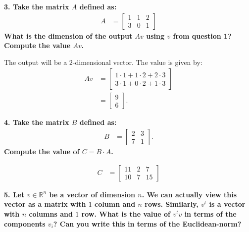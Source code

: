 \documentclass[12pt,hidelinks]{article}
\numberwithin{equation}{section}
\begin{document}
\vspace*{12pt}

\textbf{3. Take the matrix $A$ defined as:}
\begin{align}
A &= \begin{bmatrix} 1 & 1 & 2 \\ 3 & 0 & 1 \end{bmatrix}
\end{align}
\textbf{What is the dimension of the output $Av$ using $v$ from question 1? Compute
the value $Av$.}

\vspace*{12pt}

The output will be a $2$-dimensional vector. The value is given by:
\begin{align}
Av &= \begin{bmatrix} 1\cdot1 + 1\cdot2 + 2\cdot3 \\ 3\cdot1 + 0\cdot2 + 1\cdot3 \end{bmatrix} \\
&= \begin{bmatrix} 9 \\ 6 \end{bmatrix}.
\end{align}

\vspace*{12pt}

\textbf{4. Take the matrix $B$ defined as:}
\begin{align}
B &= \begin{bmatrix} 2 & 3 \\ 7 & 1 \end{bmatrix}.
\end{align}
\textbf{Compute the value of $C = B \cdot A$.}

\vspace*{12pt}

\begin{align}
C &= \begin{bmatrix} 11 & 2 & 7 \\ 10 & 7 & 15 \end{bmatrix}
\end{align}

\vspace*{12pt}

\textbf{5. Let $v \in \mathbb{R}^n$ be a vector of dimension $n$. We can actually
view this vector as a matrix with $1$ column and $n$ rows. Similarly, $v^t$
is a vector with $n$ columns and $1$ row. What is the value of $v^t v$ in terms
of the components $v_i$? Can you write this in terms of the Euclidean-norm?}
\end{document}
